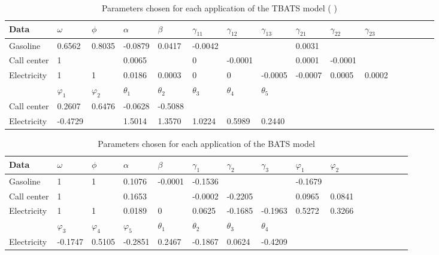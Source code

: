 \documentclass{uwstat572}
\newcommand{\vmadd}[1]{\textbf{\color{red}{#1}}}
\newcommand{\vmcomment}[1]{({\color{blue}{VM's comment:}} \textbf{\color{blue}{#1}})}
\begin{document}
\begin{table}[]
\small
\centering
\caption{Parameters chosen for each application of the TBATS model\vmadd{.} 
\vmcomment{All captions should be as self contained as possible. What do you mean by ``chosen''? Do you mean estimated?}}
\label{table:TBATS}
\begin{tabular}{l l l l l l l l l l l l l l l l}
\hline \hline
Data &$\omega$ & $\phi$ & $\alpha$  & $\beta$ & $\gamma_{11}$ & $\gamma_{12}$ & $\gamma_{13}$ & $\gamma_{21}$ & $\gamma_{22}$ & $\gamma_{23}$  \\
\hline
Gasoline &0.6562 & 0.8035 & -0.0879& 0.0417 & -0.0042 &          &   &  0.0031    &           &               \\ 
Call center &1 &   & 0.0065 &         & 0 & -0.0001 & &   0.0001     &  -0.0001 &                   \\
Electricity & 1 & 1 & 0.0186 & 0.0003       & 0  & 0 & -0.0005 &  -0.0007  & 0.0005 & 0.0002 \\ \hline
 & $\varphi_1$ & $\varphi_2$  & $\theta_1$ & $\theta_2$ &  $\theta_3$ &$\theta_4$ &  $\theta_5$\\
 Call center  &0.2607  &  0.6476  & -0.0628   & -0.5088    \\
Electricity & -0.4729 & & 1.5014 &   1.3570   & 1.0224  &  0.5989 &   0.2440     \\ \hline \hline
\end{tabular}
\end{table}



\begin{table}[]
\small
\centering
\caption{Parameters chosen for each application of the BATS model}
\label{table:BATS}
\begin{tabular}{l l l l l l l l l l l l l l l l}
\hline \hline
Data &$\omega$ & $\phi$ & $\alpha$  & $\beta$ & $\gamma_1$ & $\gamma_2$ & $\gamma_3$ &  $\varphi_1$ & $\varphi_2$ \\
\hline
Gasoline &1 & 1 & 0.1076 & -0.0001 & -0.1536 &         &         &          -0.1679 &               \\ 
Call center &1 &   & 0.1653 &         & -0.0002 & -0.2205 &         &             0.0965  & 0.0841         \\
Electricity & 1 & 1 & 0.0189 & 0       & 0.0625  & -0.1685 & -0.1963 &  0.5272  & 0.3266 \\ \hline
 &$\varphi_3$&$\varphi_4$&$\varphi_5$ & $\theta_1$ & $\theta_2$ &  $\theta_3$ &$\theta_4$ &  \\
Electricity &  -0.1747 & 0.5105 & -0.2851&0.2467 & -0.1867 & 0.0624 & -0.4209    \\ \hline \hline
\end{tabular}
\end{table}
\end{document}
